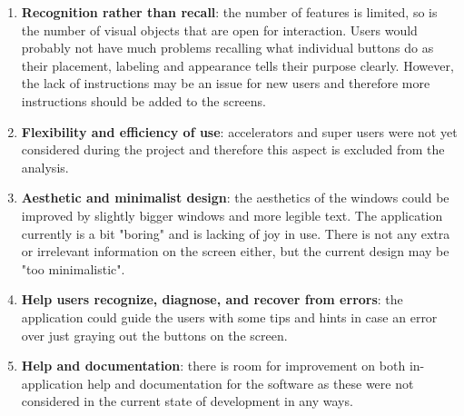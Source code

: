 \begin{enumerate}
	\item \textbf{Recognition rather than recall}: the number of features is limited, so is the number of visual objects that are open for interaction. Users would probably not have much problems recalling what individual buttons do as their placement, labeling and appearance tells their purpose clearly. However, the lack of instructions may be an issue for new users and therefore more instructions should be added to the screens.
	\item \textbf{Flexibility and efficiency of use}: accelerators and super users were not yet considered during the project and therefore this aspect is excluded from the analysis.
	\item \textbf{Aesthetic and minimalist design}: the aesthetics of the windows could be improved by slightly bigger windows and more legible text. The application currently is a bit "boring" and is lacking of joy in use. There is not any extra or irrelevant information on the screen either, but the current design may be "too minimalistic". 
	\item \textbf{Help users recognize, diagnose, and recover from errors}: the application could guide the users with some tips and hints in case an error over just graying out the buttons on the screen. 
	\item \textbf{Help and documentation}: there is room for improvement on both in-application help and documentation for the software as these were not considered in the current state of development in any ways. 
\end{enumerate}
